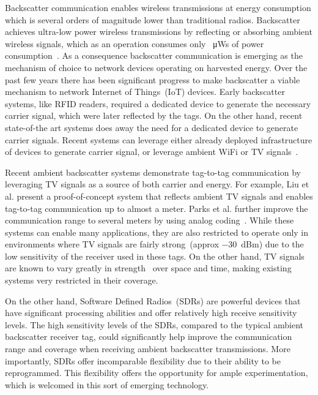 Backscatter communication enables wireless transmissions
at energy consumption which is several orders of magnitude
lower than traditional radios. Backscatter achieves ultra-low
power wireless transmissions by reflecting or absorbing ambient
wireless signals, which as an operation consumes only 
\SI{}{\micro\watt}s of power consumption~\cite{liu_ambient_2013}. 
As a consequence backscatter
communication is emerging as the mechanism of choice to network
devices operating on harvested energy.  
Over the past few years there has been significant progress
to make backscatter a viable mechanism to network Internet of
Things~(IoT) devices. Early backscatter systems, like RFID readers, required a
dedicated device to generate the necessary carrier signal, which were later
reflected by the tags. On the other hand, recent state-of-the art systems 
does away the need for a dedicated device to generate carrier signals. 
Recent systems can leverage either already deployed infrastructure of
devices to generate carrier signal, or leverage ambient WiFi or TV
signals~\cite{liu_ambient_2013}.

Recent ambient backscatter systems demonstrate tag-to-tag communication
by leveraging TV signals as a source of both carrier and energy. For
example, Liu et al. present a proof-of-concept system that reflects
ambient TV signals and enables tag-to-tag communication up to almost a
meter. Parks et al. further improve the communication range to several
meters by using analog coding~\cite{parks_turbocharging_2014}. While
these systems can enable many applications, they are also restricted to
operate only in environments where TV signals are fairly strong~(approx
\SI{-30}{dBm}) due to the low sensitivity of the receiver used in these
tags. On the other hand, TV signals are known to vary greatly in
strength~\cite{wang_fm_2017} over space and time, making existing
systems very restricted in their coverage.

On the other hand, Software Defined Radios~(SDRs) are powerful devices
that have significant processing abilities and offer relatively high
receive sensitivity levels. The high sensitivity levels of the SDRs,
compared to the typical ambient backscatter receiver tag, could
significantly help improve the communication range and coverage when
receiving ambient backscatter transmissions. More importantly, SDRs
offer incomparable flexibility due to their ability to be reprogrammed.
This flexibility offers the opportunity for ample experimentation, which
is welcomed in this sort of emerging technology.

